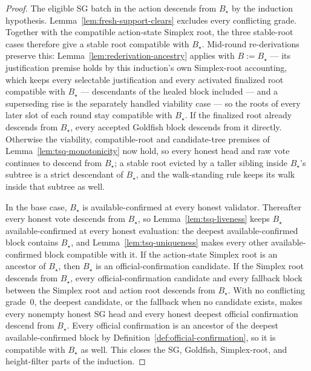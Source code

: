 \begin{proof}
The eligible SG batch in the action descends from \(B_\star\) by the
induction hypothesis.  Lemma~\ref{lem:fresh-support-clears} excludes every
conflicting grade.  Together with the compatible action-state Simplex root,
the three stable-root cases therefore give a stable root compatible with
\(B_\star\).  Mid-round re-derivations preserve this:
Lemma~\ref{lem:rederivation-ancestry} applies with \(B:=B_\star\) ---
its justification premise holds by this induction's own Simplex-root
accounting, which keeps every selectable justification and every
activated finalized root compatible with
\(B_\star\) --- descendants of the healed block included --- and a
superseding rise is the separately handled
viability case --- so the roots of every later slot of each round stay
compatible with \(B_\star\).  If the finalized root already descends from \(B_\star\), every
accepted Goldfish block descends from it directly.  Otherwise the viability,
compatible-root and candidate-tree premises of
Lemma~\ref{lem:tsq-monotonicity} now hold, so every honest head and raw
vote continues to descend from \(B_\star\); a stable root evicted by
a taller sibling inside \(B_\star\)'s subtree is a strict descendant
of \(B_\star\), and the walk-standing rule keeps its walk inside
that subtree as well.

In the base case, \(B_\star\) is available-confirmed at every honest
validator.  Thereafter every honest vote descends from \(B_\star\), so
Lemma~\ref{lem:tsq-liveness} keeps \(B_\star\) available-confirmed at
every honest evaluation: the deepest available-confirmed block contains
\(B_\star\), and Lemma~\ref{lem:tsq-uniqueness} makes every other
available-confirmed block compatible with it.  If the action-state Simplex root is an ancestor of
\(B_\star\), then \(B_\star\) is an official-confirmation candidate.  If the
Simplex root descends from \(B_\star\), every official-confirmation candidate
and every fallback block between the Simplex root and action root descends
from \(B_\star\).  With no conflicting grade~0, the deepest candidate, or
the fallback when no candidate exists, makes every nonempty honest SG head and
every honest deepest official confirmation
descend from \(B_\star\).  Every official confirmation is an ancestor of the
deepest available-confirmed block by
Definition~\ref{def:official-confirmation}, so it is compatible with
\(B_\star\) as well.
This closes the SG, Goldfish, Simplex-root, and height-filter parts of the
induction.
\end{proof}


